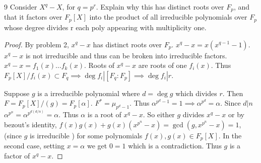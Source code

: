 \documentclass{article}
\begin{document}
\bigskip


\begin{PROB}{9}\label{Problem 9.}
    Consider $X^q - X$, for $q = p^r$. Explain why this has distinct roots over $F_p$, and that it factors over $F_p[X]$ into the product of all irreducible polynomials over $F_p$ whose degree divides r each poly appearing with multiplicity one. 
\end{PROB}
\begin{proof}
    By problem 2, $x^q - x$ has distinct roots over $F_p$. $x^q - x = x(x^{q - 1} - 1)$. $x^q - x$ is not irreducible and thus can be broken into irreducible factors. $x^q - x = f_1(x)\dots f_k(x)$. Roots of $x^q - x$ are roots of one $f_i(x)$. Thus $F_p[X] / f_i(x) \subset F_q \implies \deg 
    f_i | [F_q : F_p] \implies \deg f_i | r$. 

    Suppose $g$ is a irreducible polynomial where $d = \deg g$  which divides $r$. Then $F = F_p[X] / (g) = F_p[\alpha]$. $F^* = \mu_{p^d - 1}$. Thus $\alpha^{p^d - 1} = 1 \implies \alpha^{p^d } = \alpha$. Since $d | n$ $\alpha^{p^n} = \alpha^{p^{d (d / n)}} = \alpha$. Thus $\alpha$ is a root of $x^q - x$. So either $g$ divides $x^q - x$ or by bezout's identity, $f(x)g(x) + g(x)(x^{p^n} - x) = \gcd(g, x^{p^n} - x) = 1$, (since $g$ is irreducible ) for some polynomials $f(x), g(x) \in F_p[X]$. In the second case, setting $x =\alpha$ we get $0 = 1$ which is a contradiction. Thus $g$ is a factor of $x^q - x$.           

\end{proof}

\bigskip
\end{document}
